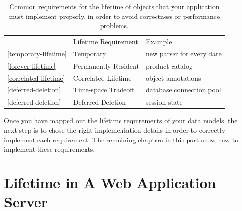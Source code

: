 \begin{table}
\centering
	\begin{tabular}{lp{}p{}}
	\toprule  & Lifetime Requirement & Example \\ \cmidrule(r){2-2} \cmidrule(l){3-3}
	\autoref{temporary-lifetime}  & {Temporary} & new
	parser for every date
	\\
	\autoref{forever-lifetime} & {Permanently Resident} & product catalog
	\\
	\autoref{correlated-lifetime} & {Correlated Lifetime}
	& object annotations
	\\
	\autoref{deferred-deletion} & {Time-space Tradeoff} &
		database connection pool \\
	\autoref{deferred-deletion} & {Deferred Deletion} &
		session state \\
	\bottomrule
	\end{tabular}
	\caption{Common requirements for the lifetime of objects that your
	application must implement properly, in order to avoid correctness or
	performance problems.}
	\label{tab:five-lifetimes}
\end{table}

Once you have mapped out the lifetime requirements of your data models, the next
step is to chose the right implementation details in order to correctly implement
each requirement. The remaining chapters in this part show how to implement these
requirements.



\section{Lifetime in A Web Application Server}


